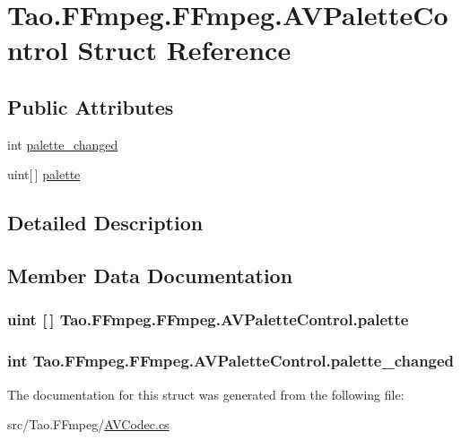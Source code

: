 \hypertarget{struct_tao_1_1_f_fmpeg_1_1_f_fmpeg_1_1_a_v_palette_control}{
\section{Tao.FFmpeg.FFmpeg.AVPaletteControl Struct Reference}
\label{struct_tao_1_1_f_fmpeg_1_1_f_fmpeg_1_1_a_v_palette_control}
}
\subsection*{Public Attributes}
\begin{DoxyCompactItemize}
\item 
int \hyperlink{struct_tao_1_1_f_fmpeg_1_1_f_fmpeg_1_1_a_v_palette_control_ad1588cabc3a21494b1ee51ae6b9d3ecf}{palette\_\-changed}
\item 
uint\mbox{[}$\,$\mbox{]} \hyperlink{struct_tao_1_1_f_fmpeg_1_1_f_fmpeg_1_1_a_v_palette_control_a1861515bd5691a53cc4a7a67ec80c6ba}{palette}
\end{DoxyCompactItemize}


\subsection{Detailed Description}


\subsection{Member Data Documentation}
\hypertarget{struct_tao_1_1_f_fmpeg_1_1_f_fmpeg_1_1_a_v_palette_control_a1861515bd5691a53cc4a7a67ec80c6ba}{
\subsubsection[{palette}]{\setlength{\rightskip}{0pt plus 5cm}uint \mbox{[}$\,$\mbox{]} {\bf Tao.FFmpeg.FFmpeg.AVPaletteControl.palette}}}
\label{struct_tao_1_1_f_fmpeg_1_1_f_fmpeg_1_1_a_v_palette_control_a1861515bd5691a53cc4a7a67ec80c6ba}
\hypertarget{struct_tao_1_1_f_fmpeg_1_1_f_fmpeg_1_1_a_v_palette_control_ad1588cabc3a21494b1ee51ae6b9d3ecf}{
\subsubsection[{palette\_\-changed}]{\setlength{\rightskip}{0pt plus 5cm}int {\bf Tao.FFmpeg.FFmpeg.AVPaletteControl.palette\_\-changed}}}
\label{struct_tao_1_1_f_fmpeg_1_1_f_fmpeg_1_1_a_v_palette_control_ad1588cabc3a21494b1ee51ae6b9d3ecf}


The documentation for this struct was generated from the following file:\begin{DoxyCompactItemize}
\item 
src/Tao.FFmpeg/\hyperlink{_a_v_codec_8cs}{AVCodec.cs}\end{DoxyCompactItemize}
